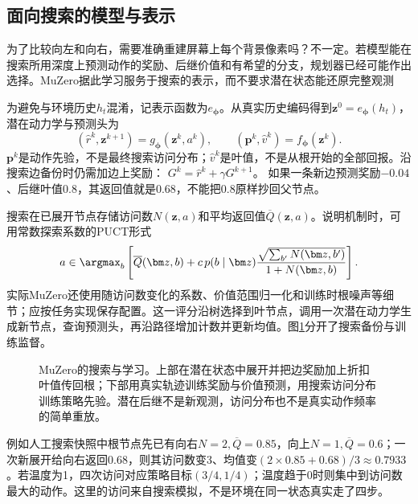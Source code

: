 \subsection{面向搜索的模型与表示}
\label{sec:rl-learning-muzero}

为了比较向左和向右，需要准确重建屏幕上每个背景像素吗？不一定。若模型能在搜索所用深度上预测动作的奖励、后继价值和有希望的分支，规划器已经可能作出选择。MuZero据此学习服务于搜索的表示，而不要求潜在状态能还原完整观测

为避免与环境历史$h_t$混淆，记表示函数为$e_{\bm\phi}$。从真实历史编码得到$\bm z^0=e_{\bm\phi}(h_t)$，潜在动力学与预测头为
\begin{equation}
  (\widehat r^k,\bm z^{k+1})=g_{\bm\phi}(\bm z^k,a^k),
  \qquad
  (\bm p^k,\widehat v^k)=f_{\bm\phi}(\bm z^k).
  \label{eq:rl-learning-muzero-model}
\end{equation}
$\bm p^k$是动作先验，不是最终搜索访问分布；$\widehat v^k$是叶值，不是从根开始的全部回报。沿搜索边备份时仍需加边上奖励：
$G^k=\widehat r^k+\gamma G^{k+1}$。
如果一条新边预测奖励$-0.04$、后继叶值$0.8$，其返回值就是$0.68$，不能把$0.8$原样抄回父节点。

搜索在已展开节点存储访问数$N(\bm z,a)$和平均返回值$\overline Q(\bm z,a)$。说明机制时，可用常数探索系数的PUCT形式
\[
  a\in\argmax_b\left[
    \overline Q(\bm z,b)
    +c\,p(b\mid\bm z)
      \frac{\sqrt{\sum_{b'}N(\bm z,b')}}{1+N(\bm z,b)}
  \right].
\]
实际MuZero还使用随访问数变化的系数、价值范围归一化和训练时根噪声等细节；应按任务实现保存配置。这一评分沿树选择到叶节点，调用一次潜在动力学生成新节点，查询预测头，再沿路径增加计数并更新均值。图\ref{fig:rl-learning-muzero}分开了搜索备份与训练监督。

\begin{figure}[t]
  \centering
  
  \caption{MuZero的搜索与学习。上部在潜在状态中展开并把边奖励加上折扣叶值传回根；下部用真实轨迹训练奖励与价值预测，用搜索访问分布训练策略先验。潜在后继不是新观测，访问分布也不是真实动作频率的简单重放。}
  \label{fig:rl-learning-muzero}
\end{figure}

例如人工搜索快照中根节点先已有向右$N=2,\overline Q=0.85$，向上$N=1,\overline Q=0.6$；一次新展开给向右返回$0.68$，则其访问数变3、均值变$(2\times0.85+0.68)/3\approx0.7933$。若温度为1，四次访问对应策略目标$(3/4,1/4)$；温度趋于0时则集中到访问数最大的动作。这里的访问来自搜索模拟，不是环境在同一状态真实走了四步。

